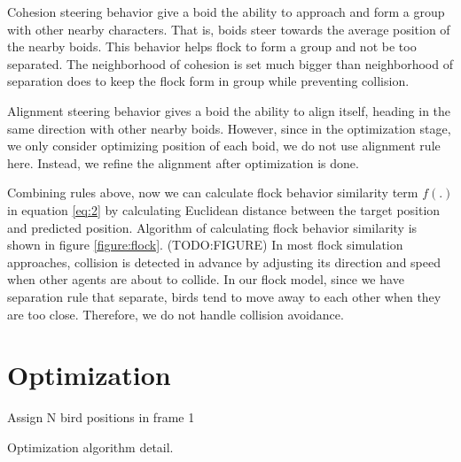 Cohesion steering behavior give a boid the ability to approach and form a group with other nearby characters. That is, boids steer towards the average position of the nearby boids. This behavior helps flock to form a group and not be too separated. The neighborhood of cohesion is set much bigger than neighborhood of separation does to keep the flock form in group while preventing collision.


Alignment steering behavior gives a boid the ability to align itself, heading in the same direction with other nearby boids. However, since in the optimization stage, we only consider optimizing position of each boid, we do not use alignment rule here. Instead, we refine the alignment after optimization is done.


Combining rules above, now we can calculate flock behavior similarity term $f(.)$ in equation \ref{eq:2} by calculating Euclidean distance between the target position and predicted position. Algorithm of calculating flock behavior similarity is shown in figure \ref{figure:flock}. (TODO:FIGURE)
In most flock simulation approaches, collision is detected in advance by adjusting its direction and speed when other agents are about to collide. In our flock model, since we have separation rule that separate, birds tend to move away to each other when they are too close. Therefore, we do not handle collision avoidance.


\section{Optimization}

\begin{algorithm}%
\SetAlgoLined
{}
Assign N bird positions in frame 1 \;

\caption{Optimization algorithm detail.}
\label{algo:optimization}
\end{algorithm}



